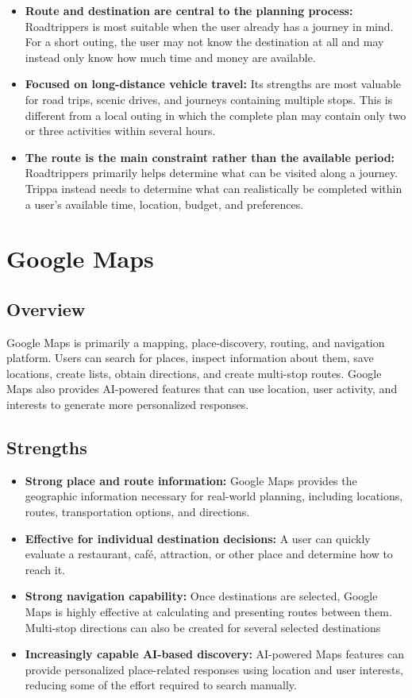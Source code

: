 \begin{itemize}
\item \textbf{Route and destination are central to the planning process:} Roadtrippers is most suitable when the user already has a journey in mind. For a short outing, the user may not know the destination at all and may instead only know how much time and money are available.
\item \textbf{Focused on long-distance vehicle travel:} Its strengths are most valuable for road trips, scenic drives, and journeys containing multiple stops. This is different from a local outing in which the complete plan may contain only two or three activities within several hours.
\item \textbf{The route is the main constraint rather than the available period:} Roadtrippers primarily helps determine what can be visited along a journey. Trippa instead needs to determine what can realistically be completed within a user's available time, location, budget, and preferences.
\end{itemize}


\section{Google Maps}

\subsection{Overview}

Google Maps is primarily a mapping, place-discovery, routing, and navigation platform. Users can search for places, inspect information about them, save locations, create lists, obtain directions, and create multi-stop routes. Google Maps also provides AI-powered features that can use location, user activity, and interests to generate more personalized responses.


\subsection{Strengths}

\begin{itemize}
\item \textbf{Strong place and route information:} Google Maps provides the geographic information necessary for real-world planning, including locations, routes, transportation options, and directions.
\item \textbf{Effective for individual destination decisions:} A user can quickly evaluate a restaurant, café, attraction, or other place and determine how to reach it.
\item \textbf{Strong navigation capability:} Once destinations are selected, Google Maps is highly effective at calculating and presenting routes between them. Multi-stop directions can also be created for several selected destinations
\item \textbf{Increasingly capable AI-based discovery:} AI-powered Maps features can provide personalized place-related responses using location and user interests, reducing some of the effort required to search manually.
\end{itemize}


